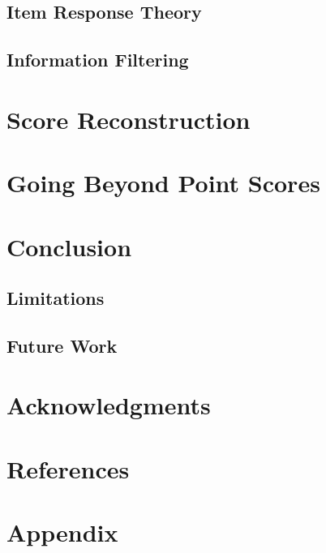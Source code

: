 \documentclass{article}
\begin{document}
\subsection{Item Response Theory}
\subsection{Information Filtering}

\section{Score Reconstruction}

\section{Going Beyond Point Scores}
\section{Conclusion}
\subsection{Limitations}
\subsection{Future Work}

\section*{Acknowledgments}
\section*{References}
\section*{Appendix}
\end{document}
